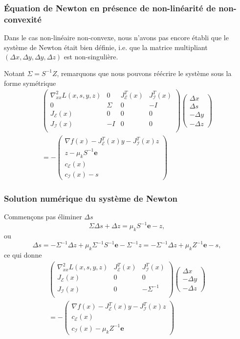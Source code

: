 \documentclass[usepdftitle=false]{beamer}
\def\cE{\mathcal{E}}
\def\cI{\mathcal{I}}
\def\be{\boldsymbol{e}}
\begin{document}
\begin{frame}
\frametitle{Équation de Newton en présence de non-linéarité de non-convexité}

Dans le cas non-linéaire non-convexe, nous n'avons pas encore établi que le système de Newton était bien définie, i.e. que la matrice multipliant $(\Delta x, \Delta y, \Delta y, \Delta z)$ est non-singulière.

Notant $\Sigma = S^{-1}Z$, remarquons que nous pouvons réécrire le système sous la forme symétrique
\begin{multline*}
\begin{pmatrix}
\nabla^2_{xx} L(x,s,y,z) & 0 &  J^T_{\cE}(x) &  J^T_{\cI}(x) \\
0 & \Sigma & 0 & -I \\
J_{\cE}(x) & 0 & 0 & 0 \\
J_{\cI}(x) & -I & 0 & 0 \\
\end{pmatrix}
\begin{pmatrix}
\Delta x \\
\Delta s \\
-\Delta y \\
-\Delta z	
\end{pmatrix}
\\
= -\begin{pmatrix}
\nabla f(x) - J^T_{\cE}(x) y - J^T_{\cI} (x) z \\
z - \mu_k S^{-1} \be \\
c_{\cE}(x) \\
c_{\cI}(x)-s
\end{pmatrix}
\end{multline*}

\end{frame}

\begin{frame}
\frametitle{Solution numérique du système de Newton}

Commençons pas éliminer $\Delta s$
$$
\Sigma \Delta s + \Delta z = \mu_k S^{-1} \be - z,
$$
ou
$$
\Delta s = - \Sigma^{-1} \Delta z + \mu_k \Sigma^{-1}S^{-1} \be - \Sigma^{-1}z = - \Sigma^{-1} \Delta z + \mu_k Z^{-1} \be - s,
$$
ce qui donne
\begin{multline*}
	\begin{pmatrix}
		\nabla^2_{xx} L(x,s,y,z) &  J^T_{\cE}(x) &  J^T_{\cI}(x) \\
		J_{\cE}(x) & 0 & 0 \\
		J_{\cI}(x) & 0 & -\Sigma^{-1} \\
	\end{pmatrix}
	\begin{pmatrix}
		\Delta x \\
		-\Delta y \\
		-\Delta z	
	\end{pmatrix}
	\\
	= -\begin{pmatrix}
		\nabla f(x) - J^T_{\cE}(x) y - J^T_{\cI} (x) z \\
		c_{\cE}(x) \\
		c_{\cI}(x)- \mu_k Z^{-1} \be
	\end{pmatrix}
\end{multline*}

\end{frame}
\end{document}

